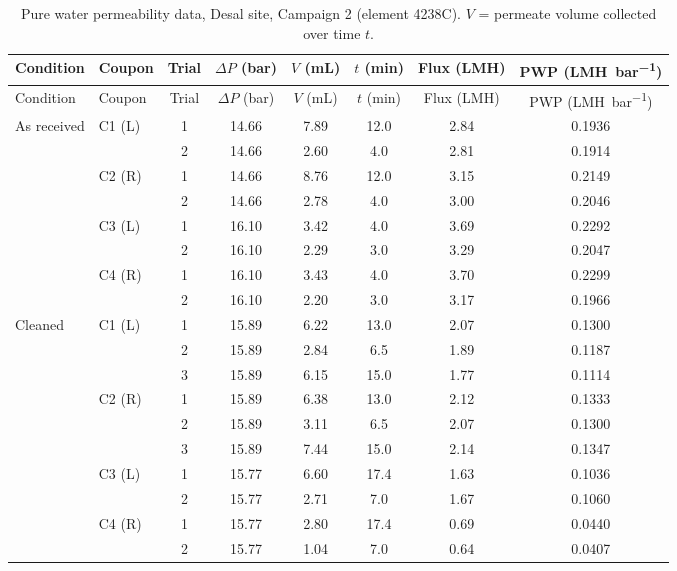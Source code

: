 {\footnotesize\setlength{\tabcolsep}{4pt}
\begin{longtable}{llcccccc}
  \caption{Pure water permeability data, Desal site, Campaign 2 (element 4238C). $V$ = permeate volume collected over time $t$.}
  \label{tab:app-c2-desal-pwp}\\
  \toprule
  Condition & Coupon & Trial & $\Delta P$ (\unit{bar}) & $V$ (\unit{mL}) & $t$ (\unit{min}) & Flux (\unit{LMH}) & PWP (\unit{LMH.bar^{-1}}) \\
  \midrule
  \endfirsthead
  \toprule
  Condition & Coupon & Trial & $\Delta P$ (\unit{bar}) & $V$ (\unit{mL}) & $t$ (\unit{min}) & Flux (\unit{LMH}) & PWP (\unit{LMH.bar^{-1}}) \\
  \midrule
  \endhead
    As received & C1 (L) & 1 & 14.66 & 7.89 & 12.0 & 2.84 & 0.1936 \\
     &  & 2 & 14.66 & 2.60 & 4.0 & 2.81 & 0.1914 \\
    \addlinespace[2pt]
     & C2 (R) & 1 & 14.66 & 8.76 & 12.0 & 3.15 & 0.2149 \\
     &  & 2 & 14.66 & 2.78 & 4.0 & 3.00 & 0.2046 \\
    \addlinespace[2pt]
     & C3 (L) & 1 & 16.10 & 3.42 & 4.0 & 3.69 & 0.2292 \\
     &  & 2 & 16.10 & 2.29 & 3.0 & 3.29 & 0.2047 \\
    \addlinespace[2pt]
     & C4 (R) & 1 & 16.10 & 3.43 & 4.0 & 3.70 & 0.2299 \\
     &  & 2 & 16.10 & 2.20 & 3.0 & 3.17 & 0.1966 \\
    \midrule
    Cleaned & C1 (L) & 1 & 15.89 & 6.22 & 13.0 & 2.07 & 0.1300 \\
     &  & 2 & 15.89 & 2.84 & 6.5 & 1.89 & 0.1187 \\
     &  & 3 & 15.89 & 6.15 & 15.0 & 1.77 & 0.1114 \\
    \addlinespace[2pt]
     & C2 (R) & 1 & 15.89 & 6.38 & 13.0 & 2.12 & 0.1333 \\
     &  & 2 & 15.89 & 3.11 & 6.5 & 2.07 & 0.1300 \\
     &  & 3 & 15.89 & 7.44 & 15.0 & 2.14 & 0.1347 \\
    \addlinespace[2pt]
     & C3 (L) & 1 & 15.77 & 6.60 & 17.4 & 1.63 & 0.1036 \\
     &  & 2 & 15.77 & 2.71 & 7.0 & 1.67 & 0.1060 \\
    \addlinespace[2pt]
     & C4 (R) & 1 & 15.77 & 2.80 & 17.4 & 0.69 & 0.0440 \\
     &  & 2 & 15.77 & 1.04 & 7.0 & 0.64 & 0.0407 \\

\end{longtable}}
